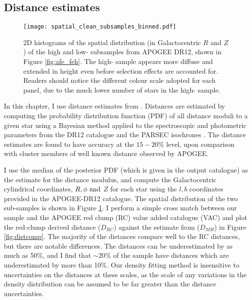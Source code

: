  \subsection{Distance estimates}
 \label{sec:distances}
 
  \begin{figure}
 \centering
 	\texttt{[image: spatial\_clean\_subsamples\_binned.pdf]}
     \caption[The Galactocentric $R$ and $z$ distribution of stars in the APOGEE DR12 high and low-\afe{} populations]{2D histograms of the spatial distribution (in Galactocentric $R$ and $Z$) of the high and low-\afe{} subsamples from APOGEE DR12, shown in Figure \ref{fig:afe_feh}. The high-\afe{} sample appears more diffuse and extended in height even before selection effects are accounted for. Readers should notice the different colour scale adopted for each panel, due to the much lower number of stars in the high-\afe{} sample.}
     \label{fig:spatial}
 \end{figure}
In this chapter, I use distance estimates from \citet{2014AJ....147..116H} \citep[But see also][for further description]{2015ApJ...808..132H}. Distances are estimated by computing the probability distribution function (PDF) of all distance moduli to a given star using a Bayesian method applied to the spectroscopic and photometric parameters from the DR12 catalogue and the PARSEC isochrones \citep{2012MNRAS.427..127B}. The distance estimates are found to have accuracy at the $15-20\%$ level, upon comparison with cluster members of well known distance observed by APOGEE. 

I use the median of the posterior PDF (which is given in the output catalogue) as the estimate for the distance modulus, and compute the Galactocentric cylindrical coordinates, $R, \phi\ \rm{and}$  $Z$ for each star using the $l,b$ coordinates provided in the APOGEE-DR12 catalogue. The spatial distribution of the two \afe{} sub-samples is shown in Figure \ref{fig:spatial}. I perform a simple cross match between our sample and the APOGEE red clump (RC) value added catalogue (VAC) \citep{2014ApJ...790..127B} and plot the red-clump derived distance ($D_{RC}$) against the estimate from \citet{2014AJ....147..116H} ($D_{MH}$) in Figure \ref{fig:distcomp}. The majority of the \citet{2014AJ....147..116H} distances compare well to the RC distances, but there are notable differences. The \citet{2014AJ....147..116H} distances can be underestimated by as much as 50\%, and I find that $\sim20\%$ of the sample have distances which are underestimated by more than 10\%. Our density fitting method is insensitive to uncertainties on the distances at these scales, as the scale of any variations in the density distribution can be assumed to be far greater than the distance uncertainties. 

